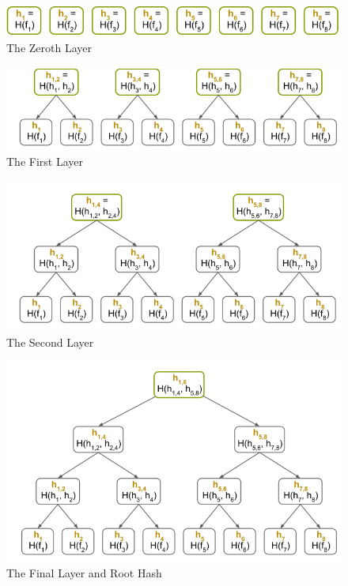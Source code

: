 \documentclass{article}
\begin{document}
\begin{figure}[htp]
    \centering
    \includegraphics[width=12cm]{Layer 0}
    \caption{The Zeroth Layer}
    \label{fig:f1}
\end{figure}

\begin{figure}[htp]
    \centering
    \includegraphics[width=12cm]{Layer 1}
    \caption{The First Layer}
    \label{fig:f2}
\end{figure}

\begin{figure}[htp]
    \centering
    \includegraphics[width=12cm]{Layer 2}
    \caption{The Second Layer}
    \label{fig:f3}
\end{figure}

\begin{figure}[htp]
    \centering
    \includegraphics[width=12cm]{Final Layer}
    \caption{The Final Layer and Root Hash}
    \label{fig:f4}
\end{figure}
\end{document}
